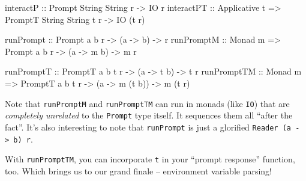 \documentclass[]{article}
\newenvironment{Shaded}{}{}
\newcommand{\DataTypeTok}[1]{\textcolor[rgb]{0.56,0.13,0.00}{{#1}}}
\newcommand{\OtherTok}[1]{\textcolor[rgb]{0.00,0.44,0.13}{{#1}}}
\newcommand{\NormalTok}[1]{{#1}}
\begin{document}
\begin{Shaded}
\begin{Highlighting}[]
\OtherTok{interactP   ::}                  \DataTypeTok{Prompt}  \DataTypeTok{String} \DataTypeTok{String}   \NormalTok{r }\OtherTok{->} \DataTypeTok{IO} \NormalTok{r}
\OtherTok{interactPT  ::} \DataTypeTok{Applicative} \NormalTok{t }\OtherTok{=>} \DataTypeTok{PromptT} \DataTypeTok{String} \DataTypeTok{String} \NormalTok{t r }\OtherTok{->} \DataTypeTok{IO} \NormalTok{(t r)}

\OtherTok{runPrompt   ::}                  \DataTypeTok{Prompt}  \NormalTok{a b   r }\OtherTok{->} \NormalTok{(a }\OtherTok{->}   \NormalTok{b) }\OtherTok{->} \NormalTok{r}
\OtherTok{runPromptM  ::} \DataTypeTok{Monad} \NormalTok{m       }\OtherTok{=>} \DataTypeTok{Prompt}  \NormalTok{a b   r }\OtherTok{->} \NormalTok{(a }\OtherTok{->} \NormalTok{m b) }\OtherTok{->} \NormalTok{m r}

\OtherTok{runPromptT  ::}                  \DataTypeTok{PromptT} \NormalTok{a b t r }\OtherTok{->} \NormalTok{(a }\OtherTok{->}    \NormalTok{t b)  }\OtherTok{->} \NormalTok{t r}
\OtherTok{runPromptTM ::} \DataTypeTok{Monad} \NormalTok{m       }\OtherTok{=>} \DataTypeTok{PromptT} \NormalTok{a b t r }\OtherTok{->} \NormalTok{(a }\OtherTok{->} \NormalTok{m (t b)) }\OtherTok{->} \NormalTok{m (t r)}
\end{Highlighting}
\end{Shaded}

Note that \texttt{runPromptM} and \texttt{runPromptTM} can run in monads
(like \texttt{IO}) that are \emph{completely unrelated} to the
\texttt{Prompt} type itself. It sequences them all ``after the fact''.
It's also interesting to note that \texttt{runPrompt} is just a
glorified \texttt{Reader\ (a\ -\textgreater{}\ b)\ r}.

With \texttt{runPromptTM}, you can incorporate \texttt{t} in your
``prompt response'' function, too. Which brings us to our grand finale
-- environment variable parsing!
\end{document}
